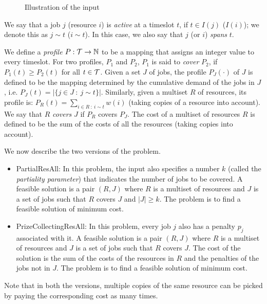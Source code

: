 \documentclass[11pt]{article}
\newcommand{\PResAll}{{\sc PartialResAll}}
\newcommand{\PCResAll}{{\sc PrizeCollectingResAll}}
\newcommand{\cT} {{\cal T}}
\begin{document}
\begin{figure*}[t]
\begin{center}
\end{center}
\caption{Illustration of the input}
\label{fig:cc}
\end{figure*}

We say that a job $j$ (resource $i$) is {\it active} at a timeslot $t$, 
if $t \in I(j)$ ($I(i)$); we  denote this as $j \sim t$ ($i \sim t$).
In this case, we also say that $j$ (or $i$) {\em spans} $t$.



We define a {\em profile} $P: \cT \rightarrow \mathbb{N}$ to be a mapping that assigns an integer value 
to every timeslot. For two profiles, $P_1$ and $P_2$, $P_1$ is said to {\em cover} $P_2$, 
if $P_1(t) \geq P_2(t)$ for all $t \in \cT$.
Given a set $J$ of jobs, the profile $P_J(\cdot)$ of $J$ is defined to be the mapping determined by 
the cumulative demand of the jobs in $J$, i.e. $P_J(t) = |\{ j \in J~:~j \sim t \}|$.
Similarly, given a multiset $R$ of resources, its profile is: $P_R(t) = \sum_{i \in R~:~i \sim t} w(i)$
(taking copies of a resource into account). 
We say that $R$ {\em covers} $J$ if $P_R$ covers $P_J$. 
The cost of a multiset of resources $R$ is defined to be the sum of the costs of all the resources 
(taking copies into account).

We now describe the two versions of the problem.
\begin{itemize}
\item  {\PResAll}: In this problem, the input also specifies a number $k$ (called the {\em partiality parameter})
       that indicates the 
	number of jobs to be covered. A feasible solution is a pair $(R,J)$ where $R$ is a multiset of resources
	and $J$ is a set of jobs such that $R$ covers $J$ and $|J| \ge k$.
	The problem is to find a feasible solution of minimum cost.
\item  {\PCResAll}: In this problem, every job $j$ also has a penalty $p_j$ associated with it.
	A feasible solution is a pair $(R,J)$ where $R$ is a multiset of resources
	and $J$ is a set of jobs such that $R$ covers $J$.
	The cost of the solution is the sum of the 
	costs of the resources in $R$ and the penalties of the jobs not in $J$.
	The problem is to find a feasible solution of minimum cost.
\end{itemize}
Note that in both the versions, multiple copies of the same resource can be picked
by paying the corresponding cost as many times.
\end{document}

